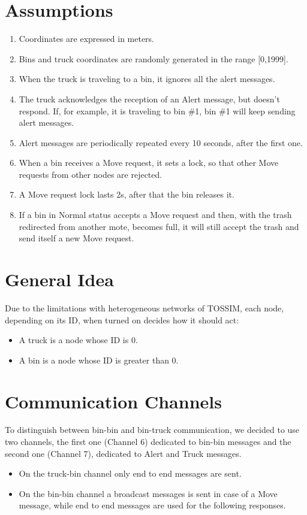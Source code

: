 \documentclass[a4paper,12pt,notitlepage]{report}
\begin{document}
\section*{Assumptions}
\begin{enumerate}
    \item Coordinates are expressed in meters.
    \item Bins and truck coordinates are randomly generated in the range [0,1999].
    \item When the truck is traveling to a bin, it ignores all the alert messages.
    \item The truck acknowledges the reception of an Alert message, but doesn't respond.
        If, for example, it is traveling to bin \#1, bin \#1 will keep sending alert messages.
    \item Alert messages are periodically repeated every 10 seconds, after the first one.
    \item When a bin receives a Move request, it sets a lock, so that other Move requests from other nodes are rejected.
    \item A Move request lock lasts 2s, after that the bin releases it.
    \item If a bin in Normal status accepts a Move request and then, with the trash redirected from another mote,
        becomes full, it will still accept the trash and send itself a new Move request.
\end{enumerate}

\section*{General Idea}
Due to the limitations with heterogeneous networks of TOSSIM, each node, depending on its ID, when turned on decides how it should act:
\begin{itemize}
    \item A truck is  a node whose ID is 0.
    \item A bin is  a node whose ID is greater than 0.
\end{itemize}

\section*{Communication Channels}
To distinguish between bin-bin and bin-truck communication, we decided to use two channels, the first one (Channel 6) dedicated
to bin-bin messages and the second one (Channel 7), dedicated to Alert and Truck messages.
\begin{itemize}
    \item On the truck-bin channel only end to end messages are sent.
    \item On the bin-bin channel a broadcast messages is sent in case of a Move message, while end to end messages are used for the following responses.
\end{itemize}
\end{document}
